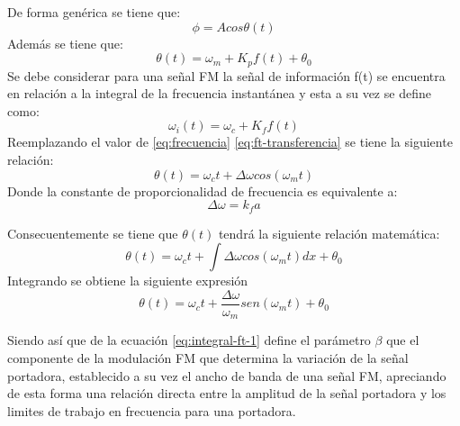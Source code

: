 \documentclass[]{article}
\begin{document}
	De forma genérica se tiene que:
	\begin{equation}
		\phi = Acos\theta(t) \label{eq:ec-general-fm}
	\end{equation}
	Además se tiene que:
	\begin{equation}
		\theta(t) = \omega_m + K_pf(t) + \theta_0 \label{eq:ft-transferencia}
	\end{equation}
	Se debe considerar para una señal FM la señal de información f(t) se encuentra en relación a la integral de la frecuencia instantánea y esta a su vez se define como:
	\begin{equation}
		\omega_{i}(t) = \omega_c + K_ff(t) \label{eq:frecuencia}
	\end{equation}
	Reemplazando el valor de \ref{eq:frecuencia} \ref{eq:ft-transferencia} se tiene la siguiente relación:
	\begin{equation}
		\theta(t) = \omega_ct + \Delta\omega cos(\omega_mt)
	\end{equation}
	Donde la constante de proporcionalidad de frecuencia es equivalente a:
	\begin{equation}
		\Delta\omega = k_fa
	\end{equation}
	
	Consecuentemente se tiene que $\theta(t)$ tendrá la siguiente relación matemática:
	\begin{equation}
		\theta(t) = \omega_ct + \int{\Delta\omega cos(\omega_mt)dx} + \theta_0 \label{eq:integral-ft}
	\end{equation}
	Integrando se obtiene la siguiente expresión
	\begin{equation}
		\theta(t) = \omega_ct + \frac{\Delta\omega}{\omega_m} sen(\omega_mt) + \theta_0 \label{eq:integral-ft-1}
	\end{equation}
	
	Siendo así que de la ecuación \ref{eq:integral-ft-1} define el parámetro $\beta$ que el componente de la modulación FM que determina la variación de la señal portadora, establecido a su vez el ancho de banda de una señal FM, apreciando de esta forma una relación directa entre la amplitud de la señal portadora y los limites de trabajo en frecuencia para una portadora.
	
\end{document}

